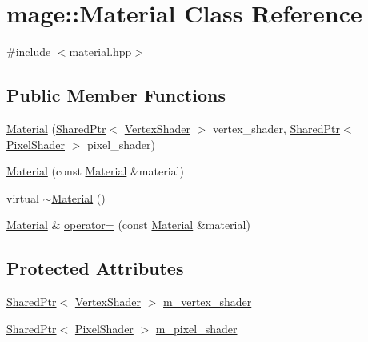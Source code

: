\hypertarget{classmage_1_1_material}{}\section{mage\+:\+:Material Class Reference}
\label{classmage_1_1_material}


{\ttfamily \#include $<$material.\+hpp$>$}

\subsection*{Public Member Functions}
\begin{DoxyCompactItemize}
\item 
\hyperlink{classmage_1_1_material_a60ff5af1b5f634568954e9a0b714e85b}{Material} (\hyperlink{namespacemage_a1e01ae66713838a7a67d30e44c67703e}{Shared\+Ptr}$<$ \hyperlink{classmage_1_1_vertex_shader}{Vertex\+Shader} $>$ vertex\+\_\+shader, \hyperlink{namespacemage_a1e01ae66713838a7a67d30e44c67703e}{Shared\+Ptr}$<$ \hyperlink{classmage_1_1_pixel_shader}{Pixel\+Shader} $>$ pixel\+\_\+shader)
\item 
\hyperlink{classmage_1_1_material_a49a45a14ea59239597c6258ff01a705e}{Material} (const \hyperlink{classmage_1_1_material}{Material} \&material)
\item 
virtual \hyperlink{classmage_1_1_material_a536bc060adb4a43607f2469f81dc5ce3}{$\sim$\+Material} ()
\item 
\hyperlink{classmage_1_1_material}{Material} \& \hyperlink{classmage_1_1_material_aeacdf92abf29de55d0440e1ee47fda02}{operator=} (const \hyperlink{classmage_1_1_material}{Material} \&material)
\end{DoxyCompactItemize}
\subsection*{Protected Attributes}
\begin{DoxyCompactItemize}
\item 
\hyperlink{namespacemage_a1e01ae66713838a7a67d30e44c67703e}{Shared\+Ptr}$<$ \hyperlink{classmage_1_1_vertex_shader}{Vertex\+Shader} $>$ \hyperlink{classmage_1_1_material_a55d6d0a8a6c4205406177a8de31d2d23}{m\+\_\+vertex\+\_\+shader}
\item 
\hyperlink{namespacemage_a1e01ae66713838a7a67d30e44c67703e}{Shared\+Ptr}$<$ \hyperlink{classmage_1_1_pixel_shader}{Pixel\+Shader} $>$ \hyperlink{classmage_1_1_material_a2c8cc11322217b70c0cdab7de5188f3d}{m\+\_\+pixel\+\_\+shader}
\end{DoxyCompactItemize}


